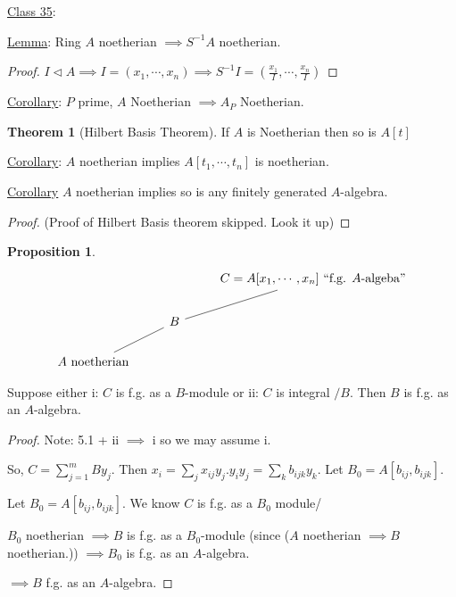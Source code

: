 \documentclass{article}
\theoremstyle{definition}
\newtheorem{theorem}{Theorem}
\newtheorem{proposition}{Proposition}
\begin{document}
\underline{Class 35}:

\underline{Lemma}: Ring \(A\) noetherian \(\implies S ^{-1} A\) noetherian.

\begin{proof}
    \(I \triangleleft A \implies I = (x_1,\cdots,x_n) \implies S ^{-1} I = (\frac{x_1}{I},\cdots,\frac{x_n}{I})\) 
\end{proof}

\underline{Corollary}: \(P\) prime, \(A\) Noetherian \(\implies A_P\) Noetherian. 

\begin{theorem}
    [Hilbert Basis Theorem]

    If \(A\) is Noetherian then so is \(A[t]\) 
\end{theorem}

\underline{Corollary}: \(A\) noetherian implies \(A[t_1,\cdots,t_n]\) is noetherian.

\underline{Corollary} \(A\) noetherian implies so is any finitely generated \(A\)-algebra.

\begin{proof}
    (Proof of Hilbert Basis theorem skipped. Look it up)
\end{proof}

\begin{proposition}

    \[
        \begin{tikzcd}
            & & C = A[x_1,\cdots,x_n] \text{ ``f.g. \(A\)-algeba''} \ar[ld, no head] \\
            & B \ar[ld, no head] & \\
            A \text{ noetherian} 
        \end{tikzcd}
    \]

    Suppose either i: \(C\) is f.g. as a \(B\)-module or ii: \(C\) is integral \(/ B\). Then \(B\) is f.g. as an \(A\)-algebra.

\end{proposition}

\begin{proof}
    Note: 5.1 + ii \(\implies\) i so we may assume i. 

    So, \(C = \sum_{j=1}^{m} By_j\). Then \(x_i = \sum_{j} x_{ij}y_j. y_i y_j = \sum_{k} b_{ijk}y_k\). Let \(B_0 = A[b_{ij},b_{ijk}]\).
    
    Let \(B_0 = A[b_{ij},b_{ijk}]\). We know \(C\) is f.g. as a \(B_0\) module/

    \(B_0\) noetherian \(\implies B\) is f.g. as a \(B_0\)-module (since (\(A\) noetherian \(\implies B\) noetherian.)) \(\implies B_0\) is f.g. as an \(A\)-algebra.
    
    \(\implies B\) f.g. as an \(A\)-algebra. 
\end{proof}
\end{document}
